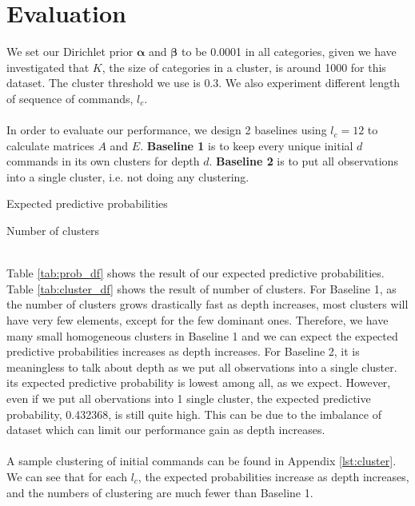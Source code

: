 \chapter{Evaluation}
We set our Dirichlet prior \(\boldsymbol{\alpha}\) and \(\boldsymbol{\beta}\) to be 
0.0001 in all categories, given we have investigated that \(K\),
the size of categories in a cluster, is around 1000 for this dataset.
The cluster threshold we use is \(0.3\).
We also experiment different length of sequence of commands, \(l_c\).
\\\\
In order to evaluate our performance, we design 2 baselines using \(l_c=12\) to calculate matrices \(A\) and \(E\). 
\textbf{Baseline 1} is to keep every unique initial \(d\) commands in its own clusters for depth \(d\).
\textbf{Baseline 2} is to put all observations into a single cluster, i.e. not doing any clustering.
\begin{table}[h]
    \centering
    
    \caption{Expected predictive probabilities}
    \label{tab:prob_df}
\end{table}
\begin{table}[h]
    \centering
    
    \caption{Number of clusters}
    \label{tab:cluster_df}
\end{table}
\\
Table \ref{tab:prob_df} shows the result of our expected predictive probabilities.
Table \ref{tab:cluster_df} shows the result of number of clusters.
For Baseline 1, as the number of clusters grows drastically fast as depth increases,
most clusters will have very few elements, except for the few dominant ones.
Therefore, we have many small homogeneous clusters in Baseline 1
and we can expect the expected predictive probabilities increases as depth increases.
For Baseline 2, it is meaningless to talk about depth as we put all observations into a single cluster.
its expected predictive probability is lowest among all, as we expect.
However, even if we put all obervations into 1 single cluster,
the expected predictive probability, 0.432368, is still quite high.
This can be due to the imbalance of dataset which can limit our performance gain as depth increases.
\\\\
A sample clustering of initial commands can be found in Appendix \ref{lst:cluster}.
We can see that for each \(l_c\), the expected probabilities increase as depth increases,
and the numbers of clustering are much fewer than Baseline 1.
